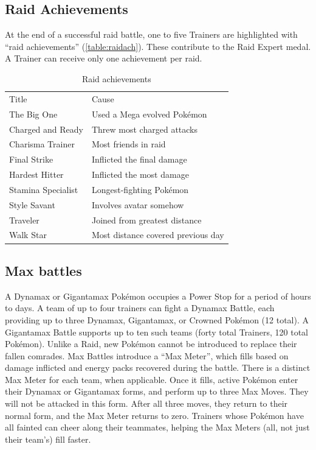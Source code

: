 \subsection{Raid Achievements\label{subsec:raidachievements}}
At the end of a successful raid battle, one to five Trainers
 are highlighted with ``raid achievements'' (\autoref{table:raidach}).
These contribute to the Raid Expert medal.
A Trainer can receive only one achievement per raid.
\begin{table}
\centering
\begin{tabular}{ll}
Title & Cause\\
\Midrule
The Big One & Used a Mega evolved Pokémon\\
Charged and Ready & Threw most charged attacks\\
Charisma Trainer & Most friends in raid\\
Final Strike & Inflicted the final damage\\
Hardest Hitter & Inflicted the most damage\\
Stamina Specialist & Longest-fighting Pokémon\\
Style Savant & Involves avatar somehow\\
Traveler & Joined from greatest distance\\
Walk Star & Most distance covered previous day\\
\end{tabular}
\caption{Raid achievements\label{table:raidach}}
\end{table}

\subsection{Max battles\label{sec:maxbattles}}
A Dynamax or Gigantamax Pokémon occupies a Power Stop for a period of hours to days.
A team of up to four trainers can fight a Dynamax Battle, each providing up to
  three Dynamax, Gigantamax, or Crowned Pokémon (12 total).
A Gigantamax Battle supports up to ten such teams (forty total Trainers, 120 total Pokémon).
Unlike a Raid, new Pokémon cannot be introduced to replace their fallen comrades.
Max Battles introduce a ``Max Meter'', which fills based on damage inflicted and
  energy packs recovered during the battle.
There is a distinct Max Meter for each team, when applicable.
Once it fills, active Pokémon enter their Dynamax or Gigantamax forms, and perform
  up to three Max Moves.
They will not be attacked in this form.
After all three moves, they return to their normal form, and the Max Meter returns to zero.
Trainers whose Pokémon have all fainted can cheer along their teammates,
  helping the Max Meters (all, not just their team's) fill faster.


